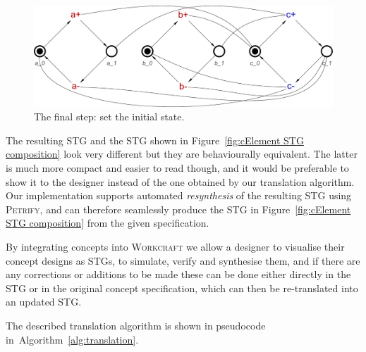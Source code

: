 \documentclass[british,compsoc]{IEEEtran}
\newcommand{\noun}[1]{\textsc{#1}}
\begin{document}
\begin{figure}[h]
\begin{centering}
\includegraphics[scale=0.23]{Images/Step-by-step12}
\par
\protect\caption{\label{fig:step-by-step12}The final step: set the initial state.}
\par\end{centering}
\end{figure}

The resulting STG and the STG shown in Figure~\ref{fig:cElement STG composition}
look very different but they are behaviourally equivalent. The latter is much more
compact and easier to read though, and it would be preferable to show it to the
designer instead of the one obtained by our translation algorithm. Our
implementation supports automated \emph{resynthesis} of the resulting STG
using \noun{Petrify}, and can therefore seamlessly produce the STG in
Figure~\ref{fig:cElement STG composition} from the given specification.

By integrating concepts into \noun{Workcraft} we allow a designer to
visualise their concept designs as STGs, to simulate, verify and synthesise them,
and if there are any corrections or additions to be made these can be done either
directly in the STG or in the original concept specification, which can then
be re-translated into an updated STG.



The described translation algorithm is shown in pseudocode
in~Algorithm~\ref{alg:translation}.
\end{document}
